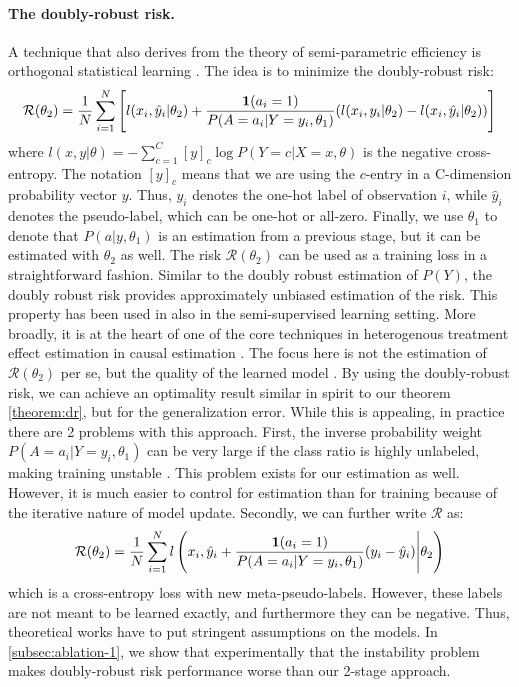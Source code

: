 \paragraph{The doubly-robust risk.} 
\label{subsec:dr-risk}
A technique that also derives from the theory of semi-parametric efficiency is orthogonal statistical learning \citep{foster2023orthogonal}. The idea is to minimize the doubly-robust risk:
\label{subsec:method-dr-risk}
\begin{equation}
\label{eq:dr-risk}
\mathcal{R}(\theta_2) = \frac{1}{N} \sum_{i=1}^N \Bigg[ l(x_i, \hat y_i|\theta_2) + \frac{\textbf{1}(a_i=1)}{P(A=a_i|Y=y_i, \theta_1)} (l(x_i, y_i | \theta_2) - l(x_i, \hat y_i | \theta_2))\Bigg]
\end{equation}
where $l(x,y|\theta) = -\sum_{c=1}^C [y]_c \log P(Y=c|X=x,\theta)$ is the negative cross-entropy. 
The notation $[y]_c$ means that we are using the $c$-entry in a C-dimension probability vector $y$. 
Thus, $y_i$ denotes the one-hot label of observation $i$, while $\hat y_i$ denotes the pseudo-label, which can be one-hot or all-zero. 
Finally, we use $\theta_1$ to denote that $P(a|y,\theta_1)$ is an estimation from a previous stage, but it can be estimated with $\theta_2$ as well. 
The risk $\mathcal{R}(\theta_2)$ can be used as a training loss in a straightforward fashion. 
Similar to the doubly robust estimation of $P(Y)$, the doubly robust risk provides approximately unbiased estimation of the risk. 
This property has been used in \citep{arelabelsinformative, onnonrandommissinglabels, drst} also in the semi-supervised learning setting.
More broadly, it is at the heart of one of the core techniques in heterogenous treatment effect estimation in causal estimation \cite{kennedy2023towards, foster2023orthogonal, wager2018estimation}. 
The focus here is not the estimation of $\mathcal{R}(\theta_2)$ per se, but the quality of the learned model \cite{foster2023orthogonal}.
By using the doubly-robust risk, we can achieve an optimality result similar in spirit to our theorem \cref{theorem:dr}, but for the generalization error.
While this is appealing, in practice there are 2 problems with this approach. First, the inverse probability weight $P(A=a_i|Y=y_i,\theta_1)$ can be very large if the class ratio is highly unlabeled, making training unstable \cite{kallus2020deepmatch, pham2023stable}. 
This problem exists for our estimation as well. However, it is much easier to control for estimation than for training because of the iterative nature of model update. Secondly, we can further write $\mathcal{R}$ as:
\begin{equation}
\mathcal{R}(\theta_2) = \frac{1}{N}\sum_{i=1}^N l\left(x_i, \hat y_i + \frac{\textbf{1}(a_i=1)}{P(A=a_i|Y=y_i,\theta_1)} (y_i - \hat y_i)\Bigg\vert\theta_2\right)
\end{equation}
which is a cross-entropy loss with new meta-pseudo-labels. However, these labels are not meant to be learned exactly, and furthermore they can be negative. Thus, theoretical works have to put stringent assumptions on the models. In \cref{subsec:ablation-1}, we show that experimentally that the instability problem makes doubly-robust risk performance worse than our 2-stage approach.

